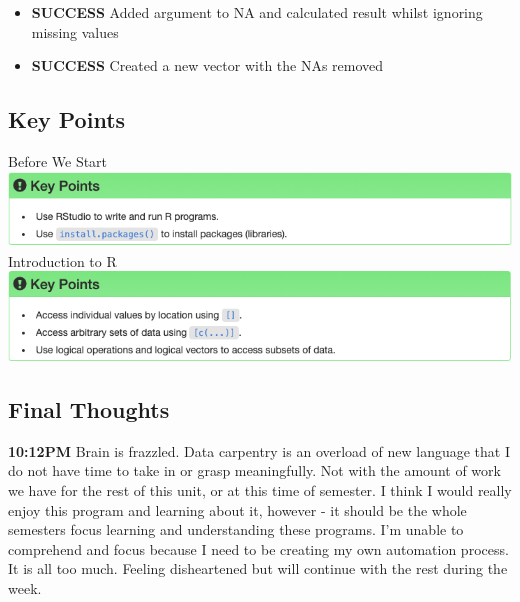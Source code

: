 \documentclass{article}
\begin{document}
\begin{itemize}
\item \textbf{SUCCESS} Added argument to NA and calculated result whilst ignoring missing values
\item \textbf{SUCCESS} Created a new vector with the NAs removed
\end{itemize}

\subsection{Key Points}
Before We Start \\
\includegraphics[width=\textwidth]{Images/RStudio_2.png} \\
Introduction to R \\
\includegraphics[width=\textwidth]{Images/RStudio_8.png} \\

\subsection{Final Thoughts}
\textbf{10:12PM} Brain is frazzled. Data carpentry is an overload of new language that I do not have time to take in or grasp meaningfully. Not with the amount of work we have for the rest of this unit, or at this time of semester. I think I would really enjoy this program and learning about it, however - it should be the whole semesters focus learning and understanding these programs. I'm unable to comprehend and focus because I need to be creating my own automation process. It is all too much. Feeling disheartened but will continue with the rest during the week. 
\end{document}
